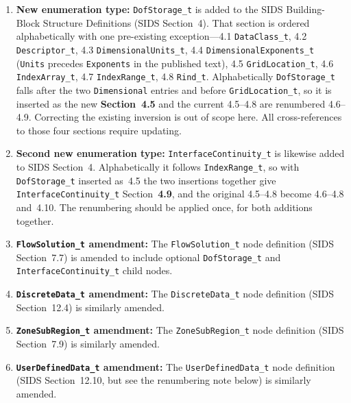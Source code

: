 \documentclass[11pt,letterpaper]{article}
\begin{document}
\begin{enumerate}[leftmargin=2em]
\item \textbf{New enumeration type:} \texttt{DofStorage\_t}
  is added to the SIDS Building-Block Structure Definitions
  (SIDS Section~4).  That section is ordered alphabetically with one
  pre-existing exception---4.1 \texttt{DataClass\_t}, 4.2
  \texttt{Descriptor\_t}, 4.3 \texttt{DimensionalUnits\_t}, 4.4
  \texttt{DimensionalExponents\_t} (\texttt{Units} precedes
  \texttt{Exponents} in the published text), 4.5
  \texttt{GridLocation\_t}, 4.6 \texttt{IndexArray\_t}, 4.7
  \texttt{IndexRange\_t}, 4.8 \texttt{Rind\_t}.  Alphabetically
  \texttt{DofStorage\_t} falls after the two \texttt{Dimensional}
  entries and before \texttt{GridLocation\_t}, so it is inserted as the
  new \textbf{Section~4.5} and the current 4.5--4.8 are renumbered
  4.6--4.9.  Correcting the existing inversion is out of scope here.
  All cross-references to those four sections require updating.

\item \textbf{Second new enumeration type:}
  \texttt{InterfaceContinuity\_t} is likewise added to SIDS
  Section~4.  Alphabetically it follows \texttt{IndexRange\_t}, so with
  \texttt{DofStorage\_t} inserted as~4.5 the two insertions together
  give \texttt{InterfaceContinuity\_t} Section~\textbf{4.9}, and the
  original 4.5--4.8 become 4.6--4.8 and~4.10.  The renumbering should be
  applied once, for both additions together.

\item \textbf{\texttt{FlowSolution\_t} amendment:} The
  \texttt{FlowSolution\_t} node definition (SIDS Section~7.7) is
  amended to include optional \texttt{DofStorage\_t} and
  \texttt{InterfaceContinuity\_t} child nodes.

\item \textbf{\texttt{DiscreteData\_t} amendment:} The
  \texttt{DiscreteData\_t} node definition (SIDS Section~12.4) is
  similarly amended.

\item \textbf{\texttt{ZoneSubRegion\_t} amendment:} The
  \texttt{ZoneSubRegion\_t} node definition (SIDS Section~7.9) is
  similarly amended.

\item \textbf{\texttt{UserDefinedData\_t} amendment:} The
  \texttt{UserDefinedData\_t} node definition (SIDS Section~12.10, but
  see the renumbering note below) is
  similarly amended.


\end{enumerate}
\end{document}
